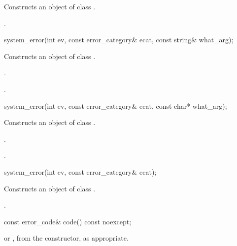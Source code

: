 \begin{itemdescr}
\pnum
\effects Constructs an object of class .

\pnum
\postconditions {}.
\end{itemdescr}

\begin{itemdecl}
system_error(int ev, const error_category& ecat,
  const string& what_arg);
\end{itemdecl}

\begin{itemdescr}
\pnum
\effects Constructs an object of class .

\pnum
\postconditions {}.

.
\end{itemdescr}

\begin{itemdecl}
system_error(int ev, const error_category& ecat,
  const char* what_arg);
\end{itemdecl}

\begin{itemdescr}
\pnum
\effects Constructs an object of class .

\pnum
\postconditions {}.

.
\end{itemdescr}

\begin{itemdecl}
system_error(int ev, const error_category& ecat);
\end{itemdecl}

\begin{itemdescr}
\pnum
\effects Constructs an object of class .

\pnum
\postconditions {}.
\end{itemdescr}

\begin{itemdecl}
const error_code& code() const noexcept;
\end{itemdecl}

\begin{itemdescr}
\pnum
\returns {} or , from the constructor,
as appropriate.
\end{itemdescr}

